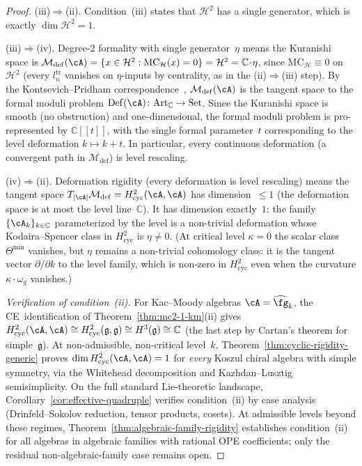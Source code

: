 \begin{proof}
\smallskip\noindent
\textup{(iii)}$\Rightarrow$\textup{(ii)}.
Condition~(iii) states that $\mathcal{H}^2$ has a single
generator, which is exactly $\dim\mathcal{H}^2 = 1$.

\smallskip\noindent
\textup{(iii)}$\Rightarrow$\textup{(iv)}.
Degree-$2$ formality with single generator~$\eta$ means the
Kuranishi space is
$\mathcal{M}_{\mathrm{def}}(\cA) =
\{x \in \mathcal{H}^2 :
\mathrm{MC}_{\mathcal{H}}(x) = 0\}
= \mathcal{H}^2 = \mathbb{C}\!\cdot\!\eta$,
since $\mathrm{MC}_{\mathcal{H}} \equiv 0$ on
$\mathcal{H}^2$ (every $l_n^{\mathrm{tr}}$
vanishes on $\eta$-inputs by centrality,
as in the (ii)$\Rightarrow$(iii) step).
By the Kontsevich--Pridham correspondence~\cite{Pridham17},
$\mathcal{M}_{\mathrm{def}}(\cA)$ is the tangent space to
the formal moduli problem
$\mathrm{Def}(\cA) \colon \mathrm{Art}_{\mathbb{C}} \to
\mathrm{Set}$.
Since the Kuranishi space is smooth (no obstruction) and
one-dimensional, the formal moduli problem is pro-represented by
$\mathbb{C}[[t]]$, with the single formal parameter~$t$
corresponding to the level deformation
$k \mapsto k + t$.  In particular, every continuous deformation
(a convergent path in $\mathcal{M}_{\mathrm{def}}$) is
level rescaling.

\smallskip\noindent
\textup{(iv)}$\Rightarrow$\textup{(ii)}.
Deformation rigidity (every deformation is level rescaling)
means the tangent space
$T_{[\cA]}\mathcal{M}_{\mathrm{def}}
= H^2_{\mathrm{cyc}}(\cA,\cA)$
has dimension~$\leq 1$
(the deformation space is at most the level line~$\mathbb{C}$).
It has dimension exactly~$1$: the family
$\{\cA_k\}_{k \in \mathbb{C}}$ parameterized by the level
is a non-trivial deformation whose Kodaira--Spencer class
in $H^2_{\mathrm{cyc}}$ is $\eta \neq 0$.
(At critical level $\kappa = 0$ the scalar class
$\Theta^{\min}$ vanishes, but
$\eta$ remains a non-trivial cohomology class:
it is the tangent vector $\partial/\partial k$ to the level
family, which is non-zero in $H^2_{\mathrm{cyc}}$ even when
the curvature $\kappa \cdot \omega_g$ vanishes.)

\smallskip\noindent
\emph{Verification of condition~\textup{(ii)}.}
For Kac--Moody algebras $\cA = \widehat{\fg}_k$,
the CE~identification of
Theorem~\ref{thm:mc2-1-km}(ii) gives
$H^2_{\mathrm{cyc}}(\cA,\cA) \cong
H^2_{\mathrm{cyc}}(\mathfrak{g},\mathfrak{g})
\cong H^3(\mathfrak{g}) \cong \mathbb{C}$
(the last step by Cartan's theorem for
simple~$\mathfrak{g}$).
At non-admissible, non-critical level~$k$,
Theorem~\ref{thm:cyclic-rigidity-generic}
proves $\dim H^2_{\mathrm{cyc}}(\cA,\cA) = 1$
for \emph{every} Koszul chiral algebra with
simple symmetry, via the Whitehead decomposition
and Kazhdan--Lusztig semisimplicity.
On the full standard Lie-theoretic landscape,
Corollary~\ref{cor:effective-quadruple} verifies
condition~(ii) by case analysis
(Drinfeld--Sokolov reduction, tensor products, cosets).
At admissible levels beyond these regimes,
Theorem~\ref{thm:algebraic-family-rigidity}
establishes condition~(ii) for all algebras in algebraic
families with rational OPE coefficients; only the residual
non-algebraic-family case remains open.
\end{proof}

